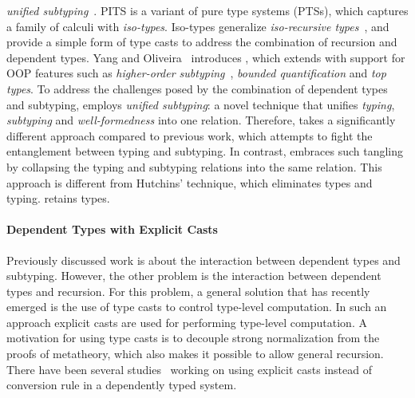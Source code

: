 \emph{unified subtyping}~\cite{full}. PITS is a variant of pure type systems (PTSs),
which captures a family of calculi with \emph{iso-types}. Iso-types generalize \emph{iso-recursive
types}~\cite{tapl}, and provide a simple form of
type casts to address the combination of recursion and
dependent types.
Yang and Oliveira~\cite{full} introduces \name, which extends
\lami with support for OOP features such as
\emph{higher-order subtyping}~\cite{fsubo}, \emph{bounded quantification} and
\emph{top types}.
To address the challenges posed by
the combination of dependent types and subtyping, \name
employs \emph{unified subtyping}: a novel technique that unifies
\emph{typing}, \emph{subtyping} and \emph{well-formedness} into one
relation. Therefore, \name takes a significantly different
approach compared to previous work, which
attempts to fight the entanglement between typing and subtyping. In
contrast, \name embraces such
tangling by collapsing the typing and subtyping
relations into the same relation.  This approach is different from
Hutchins' technique, which eliminates types and typing. \name
retains types. 


\paragraph{Dependent Types with Explicit Casts} Previously
discussed work is about the interaction between dependent types and
subtyping. However, the other problem is the
interaction between dependent types and recursion. For this
problem, a general solution that has recently emerged is the use
of type casts to control type-level computation. In such an approach explicit casts
are used for performing type-level computation. A motivation for
using type casts is to decouple strong normalization from the
proofs of metatheory, which also makes it possible to allow general
recursion. There have been several studies~\cite{guru,sjoberg:msfp12,
  kimmel:plpv, zombie:popl15, fc:kind, Doorn:2013hq,isotype} working
on using explicit casts instead of conversion rule in a dependently
typed system. 
